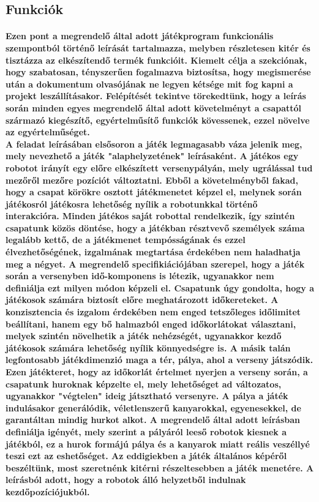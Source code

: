 \newpage
\subsection{Funkciók}
\paragraph{
Ezen pont a megrendelő által adott játékprogram funkcionális szempontból történő leírását tartalmazza, melyben részletesen kitér és tisztázza az elkészítendő termék funkcióit. Kiemelt célja a szekciónak, hogy szabatosan, tényszerűen fogalmazva biztosítsa, hogy megismerése után a dokumentum olvasójának ne legyen kétsége mit fog kapni a projekt leszállításakor. Felépítését tekintve törekedtünk, hogy a leírás során minden egyes megrendelő által adott követelményt a csapattól származó kiegészítő, egyértelműsítő funkciók kövessenek, ezzel növelve az egyértelműséget.
\\
A feladat leírásában elsősoron a játék legmagasabb váza jelenik meg, mely nevezhető a játék "alaphelyzetének" leírásaként. A játékos egy robotot irányít egy előre elkészített versenypályán, mely ugrálással tud mezőről mezőre pozíciót változtatni. Ebből a követelményből fakad, hogy a csapat körökre osztott játékmenetet képzel el, melynek során játékosról játékosra lehetőség nyílik a robotunkkal történő interakcióra. Minden játékos saját robottal rendelkezik, így szintén csapatunk közös döntése, hogy a játékban résztvevő személyek száma legalább kettő, de a játékmenet tempósságának és ezzel élvezhetőségének, izgalmának megtartása érdekében nem haladhatja meg a négyet. A megrendelő specifikiációjában szerepel, hogy a játék során a versenyben idő-komponens is létezik, ugyanakkor nem definiálja ezt milyen módon képzeli el. Csapatunk úgy gondolta, hogy a játékosok számára biztosít előre meghatározott időkereteket. A konzisztencia és izgalom érdekében nem enged tetszőleges időlimitet beállítani, hanem egy bő halmazból enged időkorlátokat választani, melyek szintén növelhetik a játék nehézségét, ugyanakkor kezdő játékosok számára lehetőség nyílik könnyedségre is. A másik talán legfontosabb játékdimenzió maga a tér, pálya, ahol a verseny játszódik. Ezen játékteret, hogy az időkorlát értelmet nyerjen a verseny során, a csapatunk huroknak képzelte el, mely lehetőséget ad változatos, ugyanakkor "végtelen" ideig játsztható versenyre. A pálya a játék indulásakor generálódik, véletlenszerű kanyarokkal, egyenesekkel, de garantáltan mindig hurkot alkot. A megrendelő által adott leírásban definiálja igényét, mely szerint a pályáról leeső robotok kiesnek a játékból, ez a hurok formájú pálya és a kanyarok miatt reális veszéllyé teszi ezt az eshetőséget. Az eddigiekben a játék általános képéről beszéltünk, most szeretnénk kitérni részeltesebben a játék menetére. A leírásból adott, hogy a robotok álló helyzetből indulnak kezdőpozíciójukból.
}
